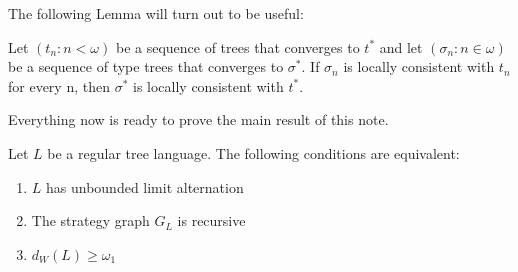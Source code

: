 The following Lemma will turn out to be useful:

\begin{lemma}\label{lemma:limit}
Let $(t_n: n <\omega)$ be a sequence of trees that converges to $t^*$ and let $(\sigma_n: n \in \omega)$ be a sequence of type trees that converges to $\sigma^*$. If $\sigma_n$ is locally consistent with $t_n$ for every n, then $\sigma^*$ is locally consistent with $t^*$.
\end{lemma}

Everything now is ready to prove the main result of this note.

\begin{theorem}
Let $L$ be a regular tree language. The following conditions are equivalent:
\begin{enumerate}



\item $L$ has unbounded limit alternation
\item The strategy graph $G_L$ is recursive
\item $d_W(L) \geq \omega_1$



\end{enumerate}
\end{theorem}

